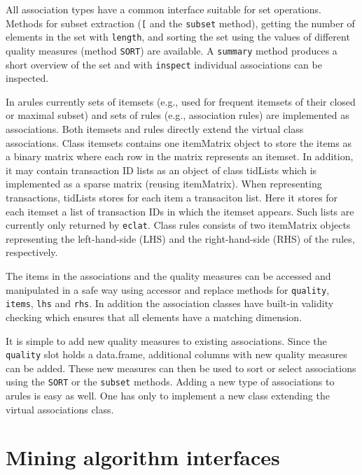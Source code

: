 \documentclass[10pt,a4paper]{article}
\newcommand{\strong}[1]{{\normalfont\fontseries{b}\selectfont #1}}
\newcommand{\class}[1]{\textsf{#1}}
\newcommand{\code}[1]{\texttt{#1}}
\newcommand{\pkg}[1]{\strong{#1}}
\begin{document}
All association types have a common interface suitable for set operations.
Methods for subset extraction (\code{[} and the \code{subset} method), 
getting the number of elements in the set with \code{length}, 
and sorting the set using the values of different quality measures 
(method \code{SORT}) are available.
A \code{summary} method produces a short overview of the set
and with \code{inspect} individual associations can be inspected.


In \pkg{arules} currently
sets of itemsets (e.g., used for frequent itemsets of their 
closed or maximal subset) and
sets of rules (e.g., association rules) are implemented as associations.  
Both itemsets and rules directly extend the
virtual class \class{associations}.
Class \class{itemsets} contains one \class{itemMatrix} object to store
the items as a binary matrix where each row in the matrix represents an
itemset. In addition, it may contain
transaction ID lists as an object of class \class{tidLists} 
which is implemented as a
sparse matrix (reusing \class{itemMatrix}).  
When representing transactions, \class{tidLists}
stores for each item a transaciton list. Here
it stores for each itemset a list of transaction IDs in which the itemset
appears. Such lists are currently only returned by \code{eclat}.
Class \class{rules} consists of two \class{itemMatrix} objects
representing the left-hand-side (LHS) and the right-hand-side (RHS) of
the rules, respectively.  

The items in the associations and the
quality measures can be accessed
and manipulated in a safe way using accessor and replace methods for
\code{quality}, \code{items}, \code{lhs} and \code{rhs}.  In addition
the association classes have built-in validity checking which ensures
that all elements have a matching dimension.

It is simple to add new quality measures to existing associations.
Since the \code{quality} slot holds a \class{data.frame}, additional
columns with new quality measures can be added.  These new measures can
then be used to sort or select associations using the \code{SORT} or the
\code{subset} methods.  Adding a new type of associations to
\pkg{arules} is easy as well.  One has only to implement a new class
extending the virtual \class{associations} class.


\section{Mining algorithm interfaces\label{sec:interfaces}}
\end{document}
